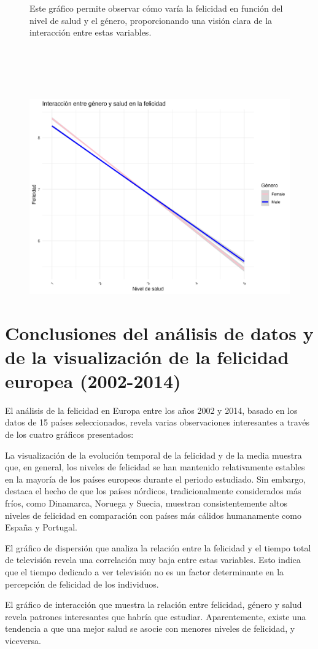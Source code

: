\documentclass{article}
\begin{document}
\begin{figure}[p]

Este gráfico permite observar cómo varía la felicidad en función del nivel de salud y el género, proporcionando una visión clara de la interacción entre estas variables.\\
\\
\\
\\
\\
\\
\centering 
\includegraphics[scale=0.8]{grafico4.png}
\end{figure}


\clearpage %
\section {Conclusiones del análisis de datos y de la visualización de la felicidad europea (2002-2014)
}


El análisis de la felicidad en Europa entre los años 2002 y 2014, basado en los datos de 15 países seleccionados, revela varias observaciones interesantes a través de los cuatro gráficos presentados:

La visualización de la evolución temporal de la felicidad y de la media muestra que, en general, los niveles de felicidad se han mantenido relativamente estables en la mayoría de los países europeos durante el periodo estudiado. Sin embargo, destaca el hecho de que los países nórdicos, tradicionalmente considerados más fríos, como Dinamarca, Noruega y Suecia, muestran consistentemente altos niveles de felicidad en comparación con países más cálidos humanamente como España y Portugal. 

El gráfico de dispersión que analiza la relación entre la felicidad y el tiempo total de televisión revela una correlación muy baja entre estas variables. Esto indica que el tiempo dedicado a ver televisión no es un factor determinante en la percepción de felicidad de los individuos. 

El gráfico de interacción que muestra la relación entre felicidad, género y salud revela patrones interesantes que habría que estudiar. Aparentemente, existe una tendencia a que una mejor salud se asocie con menores niveles de felicidad, y viceversa. 
\end{document}
